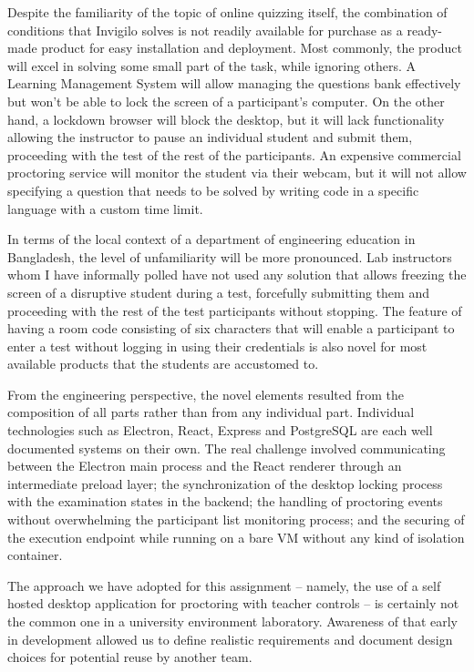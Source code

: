 \documentclass[12pt, a4paper]{report}
\begin{document}
\begin{justify}
  {\fontsize{12}{18}\selectfont
    Despite the familiarity of the topic of online quizzing itself, the combination of conditions that Invigilo solves is not readily available for purchase as a ready-made product for easy installation and deployment. Most commonly, the product will excel in solving some small part of the task, while ignoring others. A Learning Management System will allow managing the questions bank effectively but won't be able to lock the screen of a participant's computer. On the other hand, a lockdown browser will block the desktop, but it will lack functionality allowing the instructor to pause an individual student and submit them, proceeding with the test of the rest of the participants. An expensive commercial proctoring service will monitor the student via their webcam, but it will not allow specifying a question that needs to be solved by writing code in a specific language with a custom time limit.

    In terms of the local context of a department of engineering education in Bangladesh, the level of unfamiliarity will be more pronounced. Lab instructors whom I have informally polled have not used any solution that allows freezing the screen of a disruptive student during a test, forcefully submitting them and proceeding with the rest of the test participants without stopping. The feature of having a room code consisting of six characters that will enable a participant to enter a test without logging in using their credentials is also novel for most available products that the students are accustomed to.

    From the engineering perspective, the novel elements resulted from the composition of all parts rather than from any individual part. Individual technologies such as Electron, React, Express and PostgreSQL are each well documented systems on their own. The real challenge involved communicating between the Electron main process and the React renderer through an intermediate preload layer; the synchronization of the desktop locking process with the examination states in the backend; the handling of proctoring events without overwhelming the participant list monitoring process; and the securing of the execution endpoint while running on a bare VM without any kind of isolation container.

    The approach we have adopted for this assignment – namely, the use of a self hosted desktop application for proctoring with teacher controls – is certainly not the common one in a university environment laboratory. Awareness of that early in development allowed us to define realistic requirements and document design choices for potential reuse by another team.
  }
\end{justify}
\end{document}
